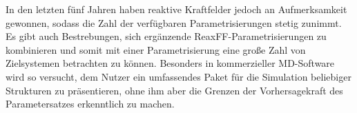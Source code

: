 \clearpage

In den letzten fünf Jahren haben reaktive Kraftfelder jedoch an Aufmerksamkeit gewonnen, sodass die Zahl der verfügbaren Parametrisierungen stetig zunimmt.
Es gibt auch Bestrebungen, sich ergänzende ReaxFF-Parametrisierungen zu kombinieren und somit mit einer Parametrisierung eine große Zahl von Zielsystemen betrachten zu können.
Besonders in kommerzieller MD-Software\cite{biovia_materials_2014} wird so versucht, dem Nutzer ein umfassendes Paket für die Simulation beliebiger Strukturen zu präsentieren, ohne ihm aber die Grenzen der Vorhersagekraft des Parametersatzes erkenntlich zu machen.
